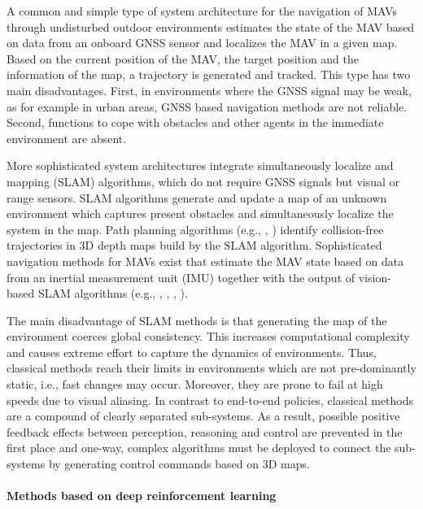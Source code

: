 A common and simple type of system architecture for the navigation of MAVs through undisturbed outdoor environments
estimates the state of the MAV based on data from an onboard GNSS sensor and localizes the MAV in a given map.
Based on the current position of the MAV, the target position and the information of the map, a trajectory is generated and tracked.
This type has two main disadvantages.
First, in environments where the GNSS signal may be weak, as for example in urban areas, GNSS based navigation methods are not reliable.
Second, functions to cope with obstacles and other agents in the immediate environment are absent.

More sophisticated system architectures integrate simultaneously localize and mapping (SLAM) algorithms, 
which do not require GNSS signals but visual or range sensors.
SLAM algorithms generate and update a map of an unknown environment which captures present obstacles and 
simultaneously localize the system in the map. \cite{Mur-Artal2015}
Path planning algorithms (e.g., \cite{Bircher2016}, \cite{Cieslewski2017}) 
identify collision-free trajectories in 3D depth maps build by the SLAM algorithm.
Sophisticated navigation methods for MAVs exist that estimate the MAV state based on data from an inertial measurement unit (IMU)
together with the output of vision-based SLAM algorithms (e.g., \cite{Lin2017}, \cite{Scaramuzza2014}, \cite{Sa2018}, \cite{Loianno2017}).


The main disadvantage of SLAM methods is that generating the map of the environment coerces global consistency.
This increases computational complexity and causes extreme effort to capture the dynamics of environments.
Thus, classical methods reach their limits in environments which are not pre-dominantly static, i.e., fast changes may occur.
Moreover, they are prone to fail at high speeds due to visual aliasing.
In contrast to end-to-end policies, classical methods are a compound of clearly separated sub-systems.
As a result, possible positive feedback effects between perception, reasoning and control 
are prevented in the first place and one-way, complex algorithms must be deployed to
connect the sub-systems by generating control commands based on 3D maps.








\paragraph{Methods based on deep reinforcement learning}


